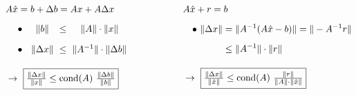 \documentclass[12pt]{article}
\begin{document}
\vspace{15pt}\noindent
\(\begin{aligned}[t]
	&A\hat{x} = b + \Delta b = Ax + A\Delta x\\[5pt]
	&\hspace{10pt} \setlength{\arraycolsep}{3pt}\begin{array}{l c c c}
			\bullet&\Vert b \Vert 			&\leq& \Vert A \Vert \cdot \Vert x \Vert\\[10pt]
			\bullet\ &\Vert \Delta x \Vert 	&\leq& \Vert A^{-1} \Vert \cdot \Vert \Delta b \Vert
		\end{array}\\[10pt]
	&\rightarrow\ \boxed{ \tfrac{\Vert \Delta x \Vert}{\Vert x \Vert} 
		\leq \text{cond}(A)\ \tfrac{\Vert \Delta b \Vert}{\Vert b \Vert}}
\end{aligned}
\hspace{2cm}
\begin{aligned}[t]
	&A\hat{x} + r = b\\[5pt]
	&\hspace{10pt} \setlength{\arraycolsep}{3pt}\begin{aligned}
			\bullet\ \Vert \Delta x \Vert 
				&= \Vert A^{-1}(A\hat{x} - b) \Vert
				= \Vert -A^{-1} r \Vert \\[5pt]
			&\leq \Vert A^{-1} \Vert \cdot \Vert r \Vert
		\end{aligned}\\[10pt]
	&\rightarrow\ \boxed{ \tfrac{\Vert \Delta x \Vert}{\Vert \hat{x} \Vert} 
		\leq \text{cond}(A)\ \tfrac{\Vert r \Vert}{\Vert A \Vert \cdot \Vert \hat{x} \Vert}}
\end{aligned}\)
\end{document}

